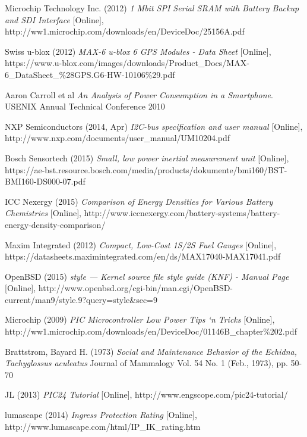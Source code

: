 \documentclass[12pt,openany,a4paper]{book}
\begin{document}
\begin{thebibliography}{99}
	Microchip Technology Inc. (2012)
	\emph{1 Mbit SPI Serial SRAM with Battery Backup and SDI Interface} [Online],
	http://ww1.microchip.com/downloads/en/DeviceDoc/25156A.pdf
	
	Swiss u-blox (2012)
	\emph{MAX-6 u-blox 6 GPS Modules - Data Sheet} [Online],
	https://www.u-blox.com/images/downloads/Product\_Docs/MAX-6\_DataSheet\_\%28GPS.G6-HW-10106\%29.pdf
	
	Aaron Carroll et al \emph{An Analysis of Power Consumption in a Smartphone}.
	USENIX Annual Technical Conference 2010
	
	NXP Semiconductors (2014, Apr)
	\emph{I2C-bus specification and user manual} [Online],
	http://www.nxp.com/documents/user\_manual/UM10204.pdf
	
	Bosch Sensortech (2015)
	\emph{Small, low power inertial measurement unit} [Online], https://ae-bst.resource.bosch.com/media/products/dokumente/bmi160/BST-BMI160-DS000-07.pdf
	
	ICC Nexergy (2015)
	\emph{Comparison of Energy Densities for Various Battery Chemistries} [Online], http://www.iccnexergy.com/battery-systems/battery-energy-density-comparison/
	
	Maxim Integrated (2012)
	\emph{Compact, Low-Cost 1S/2S Fuel Gauges} [Online], https://datasheets.maximintegrated.com/en/ds/MAX17040-MAX17041.pdf
	
	OpenBSD (2015)
	\emph{style — Kernel source file style guide (KNF) - Manual Page} [Online], http://www.openbsd.org/cgi-bin/man.cgi/OpenBSD-current/man9/style.9?query=style\&sec=9
	
	Microchip (2009)
	\emph{PIC Microcontroller Low Power
		Tips ‘n Tricks} [Online], http://ww1.microchip.com/downloads/en/DeviceDoc/01146B\_chapter\%202.pdf
	
	Brattstrom, Bayard H. (1973)
	\emph{Social and Maintenance Behavior of the Echidna, Tachyglossus aculeatus}
	Journal of Mammalogy Vol. 54 No. 1 (Feb., 1973), pp. 50-70
	
	JL (2013)
	\emph{PIC24 Tutorial} [Online], http://www.engscope.com/pic24-tutorial/
	
	lumascape (2014)
	\emph{Ingress Protection Rating} [Online], http://www.lumascape.com/html/IP\_IK\_rating.htm
\end{thebibliography}
\end{document}
